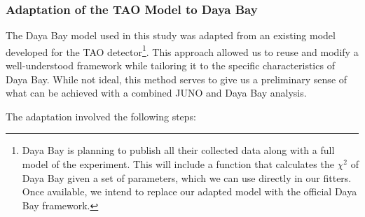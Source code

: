 \subsubsection{Adaptation of the TAO Model to Daya Bay}
The Daya Bay model used in this study was adapted from an existing model developed for the TAO
detector\footnote{Daya Bay is planning to publish all their collected data along with a full model of the experiment. This will include a function that calculates the $\chi^2$ of Daya Bay given a set of parameters, which we can use directly in our fitters. Once available, we intend to replace our adapted model with the official Daya Bay framework.}. This approach allowed us to reuse and modify a well-understood framework while tailoring
it to the specific characteristics of Daya Bay. While not ideal, this method serves to give us a preliminary sense of what can be achieved with a combined JUNO and Daya Bay analysis.

The adaptation involved the following steps:

